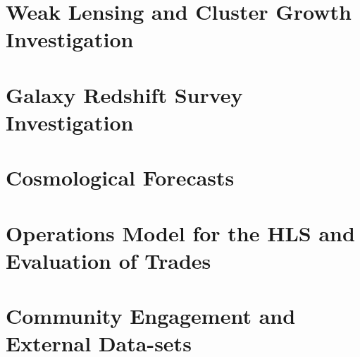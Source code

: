 \documentclass[letter]{ar-1col_WFIRST-HLS}
\begin{document}
%

\section{Weak Lensing and Cluster Growth Investigation}
\label{sec:wl_gal-clusters}


\section{Galaxy Redshift Survey Investigation}
\label{sec:gc}


\section{Cosmological Forecasts}
\label{sec:forecast}


\section{Operations Model for the HLS and Evaluation of Trades}
\label{sec:operation}


\section{Community Engagement and External Data-sets}
\label{sec:engagement}

\end{document}
